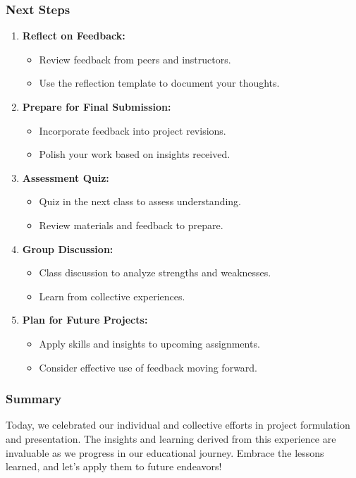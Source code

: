 \documentclass[aspectratio=169]{beamer}
\begin{document}
\begin{frame}[fragile]
    \frametitle{Next Steps}

    \begin{enumerate}
        \item \textbf{Reflect on Feedback:} 
        \begin{itemize}
            \item Review feedback from peers and instructors.
            \item Use the reflection template to document your thoughts.
        \end{itemize}
        
        \item \textbf{Prepare for Final Submission:} 
        \begin{itemize}
            \item Incorporate feedback into project revisions.
            \item Polish your work based on insights received.
        \end{itemize}
        
        \item \textbf{Assessment Quiz:} 
        \begin{itemize}
            \item Quiz in the next class to assess understanding.
            \item Review materials and feedback to prepare.
        \end{itemize}

        \item \textbf{Group Discussion:}
        \begin{itemize}
            \item Class discussion to analyze strengths and weaknesses.
            \item Learn from collective experiences.
        \end{itemize}
        
        \item \textbf{Plan for Future Projects:} 
        \begin{itemize}
            \item Apply skills and insights to upcoming assignments.
            \item Consider effective use of feedback moving forward.
        \end{itemize}
    \end{enumerate}
\end{frame}

\begin{frame}[fragile]
    \frametitle{Summary}

    Today, we celebrated our individual and collective efforts in project formulation and presentation. The insights and learning derived from this experience are invaluable as we progress in our educational journey. Embrace the lessons learned, and let’s apply them to future endeavors!
\end{frame}
\end{document}
